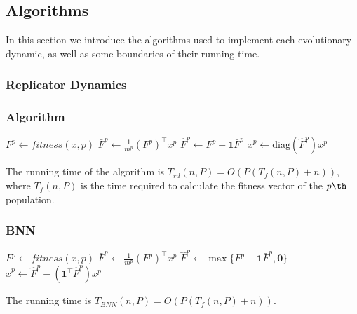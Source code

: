 
\subsection{Algorithms}
 In this section we introduce the algorithms used to implement each evolutionary dynamic, as well as some boundaries of their running time.

 
 
 
 

\subsubsection{Replicator Dynamics}


\subsubsection{Algorithm}

\begin{algorithm}[H]

 \BlankLine
 
  {
  $ F^p \leftarrow fitness(x, p)$\;
  $ \bar{F}^p \leftarrow \frac{1}{m^p} (F^p)^\top x^p$\;
  $ \hat{F}^p \leftarrow F^p - \boldsymbol{1} \bar{F}^p$\;
  $ \dot{x}^p \leftarrow \text{diag}(\hat{F}^p) x^p $\;
 }
\end{algorithm}
%
The running time of the algorithm is $T_{rd}(n, P) = O( P (  T_{f}(n,P) + n) ) $, where $T_{f}(n,P)$ is the time required to calculate the fitness vector of the $p\th$ population.







\subsubsection{BNN}

\begin{algorithm}[H]

 \BlankLine
 
  {
  $ F^p \leftarrow fitness(x, p)$\;
  $ \bar{F}^p \leftarrow \frac{1}{m^p} (F^p)^\top x^p$\;
  $ \hat{F}^p \leftarrow \max\{F^p - \boldsymbol{1} \bar{F}^p, \boldsymbol{0}\}$\;
  $ \dot{x}^p \leftarrow \hat{F}^p - (\boldsymbol{1}^\top \hat{F}^p) x^p $\;
 }
\end{algorithm}
%
The running time is $T_{BNN}(n,P) = O( P (  T_{f}(n,P) + n) ) $.








